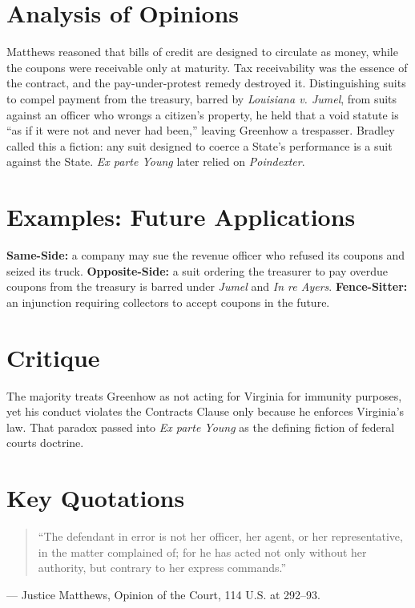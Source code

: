 \documentclass[12pt]{article}
\begin{document}
\section{Analysis of Opinions}
Matthews reasoned that bills of credit are designed to circulate as money, while the coupons were receivable only at maturity. Tax receivability was the essence of the contract, and the pay-under-protest remedy destroyed it. Distinguishing suits to compel payment from the treasury, barred by \textit{Louisiana v. Jumel}, from suits against an officer who wrongs a citizen's property, he held that a void statute is ``as if it were not and never had been,'' leaving Greenhow a trespasser. Bradley called this a fiction: any suit designed to coerce a State's performance is a suit against the State. \textit{Ex parte Young} later relied on \textit{Poindexter}.

\section{Examples: Future Applications}
\textbf{Same-Side:} a company may sue the revenue officer who refused its coupons and seized its truck. \textbf{Opposite-Side:} a suit ordering the treasurer to pay overdue coupons from the treasury is barred under \textit{Jumel} and \textit{In re Ayers}. \textbf{Fence-Sitter:} an injunction requiring collectors to accept coupons in the future.

\section{Critique}
The majority treats Greenhow as not acting for Virginia for immunity purposes, yet his conduct violates the Contracts Clause only because he enforces Virginia's law. That paradox passed into \textit{Ex parte Young} as the defining fiction of federal courts doctrine.

\section{Key Quotations}
\begin{quote}
``The defendant in error is not her officer, her agent, or her representative, in the matter complained of; for he has acted not only without her authority, but contrary to her express commands.''
\end{quote}
\noindent --- Justice Matthews, Opinion of the Court, 114 U.S. at 292--93.
\end{document}
